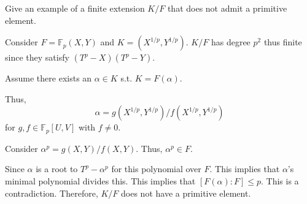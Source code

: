 \documentclass[12pt, letterpaper]{article}
\newcommand{\F}{\mathbb{F}}
\begin{document}
\begin{problem}{}
    Give an example of a finite extension $K/F$ that does not admit a primitive element.
\end{problem}
\begin{problemproof}
    Consider $F=\F_p(X,Y)$ and $K=(X^{1/p},Y^{1/p})$. $K/F$ has degree $p^2$ thus finite since they satisfy $(T^p-X)(T^p-Y)$.

    Assume there exists an $\alpha \in K$ s.t. $K=F(\alpha)$.

    Thus,
    \[\alpha=g(X^{1/p},Y^{1/p})/f(X^{1/p},Y^{1/p})\] for $g,f \in \F_p[U,V]$ with $f \neq 0$.

    Consider $\alpha^p=g(X,Y)/f(X,Y)$. Thus, $\alpha^p \in F$.

    Since $\alpha$ is a root to $T^p-\alpha^p$ for this polynomial over $F$. This implies that $\alpha$'s minimal polynomial divides this. This implies that $[F(\alpha):F] \leq p$. This is a contradiction. Therefore, $K/F$ does not have a primitive element.

    
\end{problemproof}
\end{document}

